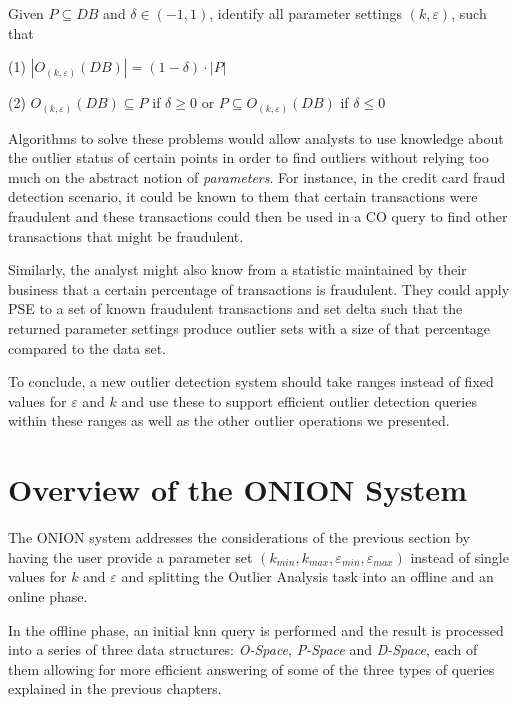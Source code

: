 \documentclass[runningheads]{llncs}
\begin{document}
\begin{definition}

\noindent Given $P\subseteq DB$ and $\delta \in (-1,1)$, identify all parameter settings $(k,\varepsilon)$, such that

\noindent(1) $|O_{(k,\varepsilon)}(DB)| = (1 - \delta) \cdot |P|$

\noindent(2) $O_{(k,\varepsilon)}(DB) \subseteq P$ if $\delta \geq 0$ or $P \subseteq O_{(k,\varepsilon)}(DB)$ if $\delta \leq 0$
\end{definition}

Algorithms to solve these problems would allow analysts to use knowledge about the outlier status of certain points in order to find outliers without relying too much on the abstract notion of \emph{parameters}. For instance, in the credit card fraud detection scenario, it could be known to them that certain transactions were fraudulent and these transactions could then be used in a CO query to find other transactions that might be fraudulent.

Similarly, the analyst might also know from a statistic maintained by their business that a certain percentage of transactions is fraudulent. They could apply PSE to a set of known fraudulent transactions and set delta such that the returned parameter settings produce outlier sets with a size of that percentage compared to the data set.

To conclude, a new outlier detection system should take ranges instead of fixed values for $\varepsilon$ and $k$ and use these to support efficient outlier detection queries within these ranges as well as the other outlier operations we presented.
\section{Overview of the ONION System}
The ONION system\cite{onion} addresses the considerations of the previous section by having the user provide a parameter set $(k_{min},k_{max},\varepsilon_{min},\varepsilon_{max})$ instead of single values for $k$ and $\varepsilon$ and splitting the Outlier Analysis task into an offline and an online phase.

In the offline phase, an initial knn query is performed and the result is processed into a series of three data structures: \emph{O-Space}, \emph{P-Space} and \emph{D-Space}, each of them allowing for more efficient answering of some of the three types of queries explained in the previous chapters.
\end{document}
